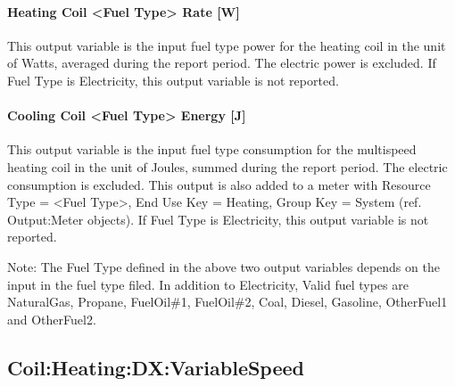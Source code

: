 \paragraph{Heating Coil \textless{}Fuel Type\textgreater{} Rate {[}W{]}}\label{heating-coil-fuel-type-rate-w}

This output variable is the input fuel type power for the heating coil in the unit of Watts, averaged during the report period. The electric power is excluded. If Fuel Type is Electricity, this output variable is not reported.

\paragraph{Cooling Coil \textless{}Fuel Type\textgreater{} Energy {[}J{]}}\label{cooling-coil-fuel-type-energy-j-1}

This output variable is the input fuel type consumption for the multispeed heating coil in the unit of Joules, summed during the report period. The electric consumption is excluded. This output is also added to a meter with Resource Type = \textless{}Fuel Type\textgreater{}, End Use Key = Heating, Group Key = System (ref. Output:Meter objects). If Fuel Type is Electricity, this output variable is not reported.

Note: The Fuel Type defined in the above two output variables depends on the input in the fuel type filed. In addition to Electricity, Valid fuel types are NaturalGas, Propane, FuelOil\#1, FuelOil\#2, Coal, Diesel, Gasoline, OtherFuel1 and OtherFuel2.

\subsection{Coil:Heating:DX:VariableSpeed}\label{coilheatingdxvariablespeed}

